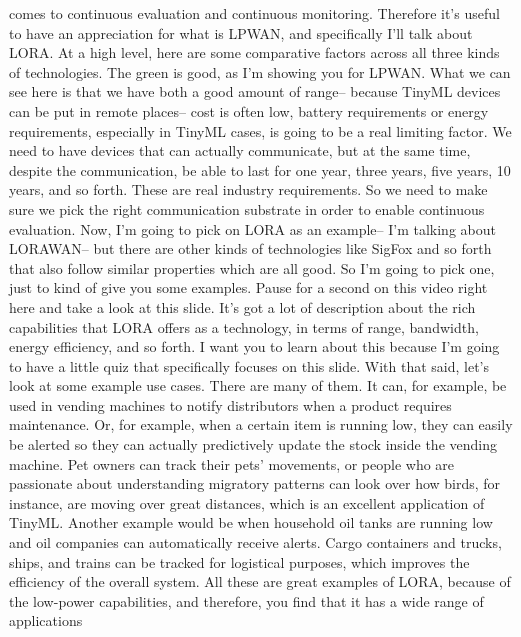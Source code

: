 {{{{{{{{    comes to continuous evaluation and continuous monitoring.
    Therefore it's useful to have an appreciation for what is LPWAN,
    and specifically I'll talk about LORA.
    At a high level, here are some comparative factors
    across all three kinds of technologies.
    The green is good, as I'm showing you for LPWAN.
    What we can see here is that we have both a good amount of range--
    because TinyML devices can be put in remote places--
    cost is often low, battery requirements or energy requirements,
    especially in TinyML cases, is going to be a real limiting factor.
    We need to have devices that can actually communicate,
    but at the same time, despite the communication,
    be able to last for one year, three years, five years, 10 years,
    and so forth.
    These are real industry requirements.
    So we need to make sure we pick the right communication substrate
    in order to enable continuous evaluation.
    Now, I'm going to pick on LORA as an example--
    I'm talking about LORAWAN--
    but there are other kinds of technologies
    like SigFox and so forth that also follow
    similar properties which are all good.
    So I'm going to pick one, just to kind of give you some examples.
    Pause for a second on this video right here and take a look at this slide.
    It's got a lot of description about the rich capabilities
    that LORA offers as a technology, in terms of range, bandwidth, energy
    efficiency, and so forth.
    I want you to learn about this because I'm
    going to have a little quiz that specifically focuses on this slide.
    With that said, let's look at some example use cases.
    There are many of them.
    It can, for example, be used in vending machines to notify distributors
    when a product requires maintenance.
    Or, for example, when a certain item is running low,
    they can easily be alerted so they can actually predictively update
    the stock inside the vending machine.
    Pet owners can track their pets' movements,
    or people who are passionate about understanding migratory patterns
    can look over how birds, for instance, are moving over great distances, which
    is an excellent application of TinyML.
    Another example would be when household oil tanks are running low
    and oil companies can automatically receive alerts.
    Cargo containers and trucks, ships, and trains
    can be tracked for logistical purposes, which improves
    the efficiency of the overall system.
    All these are great examples of LORA, because of the low-power capabilities,
    and therefore, you find that it has a wide range of applications
}}}}}}}}
